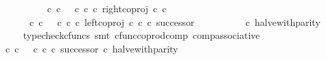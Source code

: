 \begin{isabellebody}
\ {\isachardoublequoteopen}{\isachardot}{\kern0pt}{\isachardot}{\kern0pt}{\isachardot}{\kern0pt}\ {\isacharequal}{\kern0pt}\ \isanewline
\ \ \ \ \ \ \ \ {\isacharparenleft}{\kern0pt}{\isacharparenleft}{\kern0pt}{\isacharparenleft}{\kern0pt}{\isasymf}\ {\isasymcirc}\isactrlsub c\ {\isasymbeta}\isactrlbsub {\isasymnat}\isactrlsub c\isactrlesub {\isacharparenright}{\kern0pt}\ {\isasymamalg}\ {\isacharparenleft}{\kern0pt}{\isasymt}\ {\isasymcirc}\isactrlsub c\ {\isasymbeta}\isactrlbsub {\isasymnat}\isactrlsub c\isactrlesub {\isacharparenright}{\kern0pt}\ {\isasymcirc}\isactrlsub c\ right{\isacharunderscore}{\kern0pt}coproj\ {\isasymnat}\isactrlsub c\ {\isasymnat}\isactrlsub c{\isacharparenright}{\kern0pt}\isanewline
\ \ \ \ \ \ \ \ \ \ {\isasymamalg}\ \isanewline
\ \ \ \ \ \ \ \ {\isacharparenleft}{\kern0pt}{\isacharparenleft}{\kern0pt}{\isasymf}\ {\isasymcirc}\isactrlsub c\ {\isasymbeta}\isactrlbsub {\isasymnat}\isactrlsub c\isactrlesub {\isacharparenright}{\kern0pt}\ {\isasymamalg}\ {\isacharparenleft}{\kern0pt}{\isasymt}\ {\isasymcirc}\isactrlsub c\ {\isasymbeta}\isactrlbsub {\isasymnat}\isactrlsub c\isactrlesub {\isacharparenright}{\kern0pt}\ {\isasymcirc}\isactrlsub c\ left{\isacharunderscore}{\kern0pt}coproj\ {\isasymnat}\isactrlsub c\ {\isasymnat}\isactrlsub c\ {\isasymcirc}\isactrlsub c\ successor{\isacharparenright}{\kern0pt}{\isacharparenright}{\kern0pt}\isanewline
\ \ \ \ \ \ \ \ \ \ {\isasymcirc}\isactrlsub c\ halve{\isacharunderscore}{\kern0pt}with{\isacharunderscore}{\kern0pt}parity{\isachardoublequoteclose}\isanewline
\ \ \ \ \ \ \isamarkupfalse%
\ {\isacharparenleft}{\kern0pt}typecheck{\isacharunderscore}{\kern0pt}cfuncs{\isacharcomma}{\kern0pt}\ smt\ cfunc{\isacharunderscore}{\kern0pt}coprod{\isacharunderscore}{\kern0pt}comp\ comp{\isacharunderscore}{\kern0pt}associative{}{\isacharparenright}{\kern0pt}\isanewline
\ \ \ \ \isamarkupfalse%
\ \isamarkupfalse%
\ {\isachardoublequoteopen}{\isachardot}{\kern0pt}{\isachardot}{\kern0pt}{\isachardot}{\kern0pt}\ {\isacharequal}{\kern0pt}\ {\isacharparenleft}{\kern0pt}{\isacharparenleft}{\kern0pt}{\isasymt}\ {\isasymcirc}\isactrlsub c\ {\isasymbeta}\isactrlbsub {\isasymnat}\isactrlsub c\isactrlesub {\isacharparenright}{\kern0pt}\ {\isasymamalg}\ {\isacharparenleft}{\kern0pt}{\isasymf}\ {\isasymcirc}\isactrlsub c\ {\isasymbeta}\isactrlbsub {\isasymnat}\isactrlsub c\isactrlesub \ {\isasymcirc}\isactrlsub c\ successor{\isacharparenright}{\kern0pt}{\isacharparenright}{\kern0pt}\ {\isasymcirc}\isactrlsub c\ halve{\isacharunderscore}{\kern0pt}with{\isacharunderscore}{\kern0pt}parity{\isachardoublequoteclose}\isanewline

\end{isabellebody}
